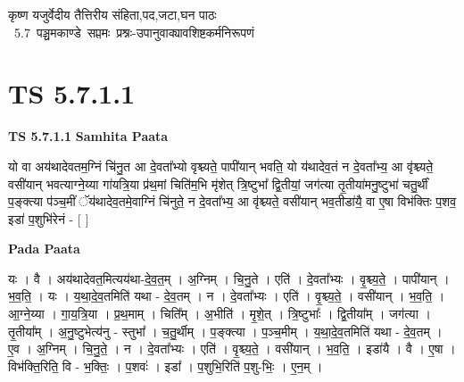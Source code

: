 \documentclass[17pt]{extarticle}
\begin{document}
\begin{titlepage}
    \begin{center}
 
\begin{sanskrit}
    { \Large
    कृष्ण यजुर्वेदीय तैत्तिरीय संहिता,पद,जटा,घन पाठः 
    }
    \\
    \vspace{2.5cm}
    \mbox{ \Large
    5.7      पञ्चमकाण्डे सप्तमः प्रश्नः-उपानुवाक्यावशिष्टकर्मनिरूपणं   }
\end{sanskrit}
\end{center}

\end{titlepage}
\tableofcontents
{}
\pagebreak


\section{ TS 5.7.1.1 }

\textbf{TS 5.7.1.1 } \newline
\textbf{Samhita Paata} \newline

यो वा अय॑थादेवतम॒ग्निं चि॑नु॒त आ दे॒वता᳚भ्यो वृश्च्यते॒ पापी॑यान् भवति॒ यो य॑थादेव॒तं न दे॒वता᳚भ्य॒ आ वृ॑श्च्यते॒ वसी॑यान् भवत्याग्ने॒य्या गा॑यत्रि॒या प्र॑थ॒मां चिति॑म॒भि मृ॑शेत् त्रि॒ष्टुभा᳚ द्वि॒तीयां॒ जग॑त्या तृ॒तीया॑मनु॒ष्टुभा॑ चतु॒र्थीं प॒ङ्क्त्या प॑ञ्च॒मीं ॅय॑थादेव॒तमे॒वाग्निं चि॑नुते॒ न दे॒वता᳚भ्य॒ आ वृ॑श्च्यते॒ वसी॑यान् भव॒तीडा॑यै॒ वा ए॒षा विभ॑क्तिः प॒शव॒ इडा॑ प॒शुभि॑रेनं - [  ] \newline

\textbf{Pada Paata} \newline

यः । वै । अय॑थादेवत॒मित्यय॑था-दे॒व॒त॒म् । अ॒ग्निम् । चि॒नु॒ते । एति॑ । दे॒वता᳚भ्यः । वृ॒श्च्य॒ते॒ । पापी॑यान् । भ॒व॒ति॒ । यः । य॒था॒दे॒व॒तमिति॑ यथा - दे॒व॒तम् । न । दे॒वता᳚भ्यः । एति॑ । वृ॒श्च्य॒ते॒ । वसी॑यान् । भ॒व॒ति॒ । आ॒ग्ने॒य्या । गा॒य॒त्रि॒या । प्र॒थ॒माम् । चिति᳚म् । अ॒भीति॑ । मृ॒शे॒त् । त्रि॒ष्टुभाः᳚ । द्वि॒तीया᳚म् । जग॑त्या । तृ॒तीया᳚म् । अ॒नु॒ष्टुभेत्य॑नु - स्तुभा᳚ । च॒तु॒र्थीम् । प॒ङ्क्त्या । प॒ञ्च॒मीम् । य॒था॒दे॒व॒तमिति॑ यथा - दे॒व॒तम् । ए॒व । अ॒ग्निम् । चि॒नु॒ते॒ । न । दे॒वता᳚भ्यः । एति॑ । वृ॒श्च्य॒ते॒ । वसी॑यान् । भ॒व॒ति॒ । इडा॑यै । वै । ए॒षा । विभ॑क्ति॒रिति॒ वि - भ॒क्तिः॒ । प॒शवः॑ । इडा᳚ । प॒शुभि॒रिति॑ प॒शु-भिः॒ । ए॒न॒म् ।  \newline
\end{document}
